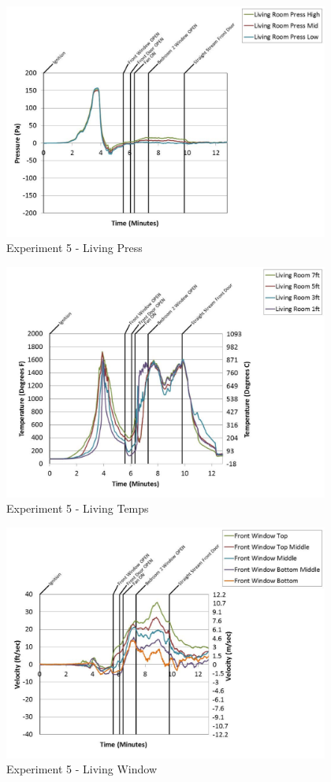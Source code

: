 \documentclass{article}
\begin{document}
\begin{appendices}
	\clearpage

	\begin{figure}[h!]
		\centering
		\includegraphics[height=3.05in]{0_Images/Results_Charts/Exp_5_Charts/LivingPress.pdf}
		\caption{Experiment 5 - Living Press}
	\end{figure}
 

	\begin{figure}[h!]
		\centering
		\includegraphics[height=3.05in]{0_Images/Results_Charts/Exp_5_Charts/LivingTemps.pdf}
		\caption{Experiment 5 - Living Temps}
	\end{figure}
 
	\clearpage

	\begin{figure}[h!]
		\centering
		\includegraphics[height=3.05in]{0_Images/Results_Charts/Exp_5_Charts/LivingWindow.pdf}
		\caption{Experiment 5 - Living Window}
	\end{figure}
 


\end{appendices}
\end{document}
